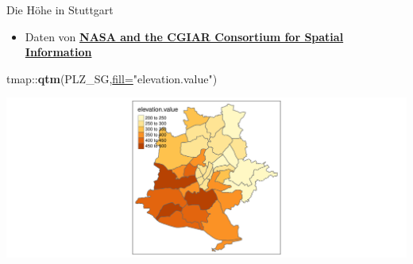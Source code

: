 \documentclass[ignorenonframetext,]{beamer}
\newenvironment{Shaded}{\begin{snugshade}}{\end{snugshade}}
\newcommand{\DataTypeTok}[1]{\textcolor[rgb]{0.74,0.68,0.62}{\underline{#1}}}
\newcommand{\KeywordTok}[1]{\textcolor[rgb]{0.26,0.66,0.93}{\textbf{#1}}}
\newcommand{\NormalTok}[1]{\textcolor[rgb]{0.74,0.68,0.62}{#1}}
\newcommand{\OperatorTok}[1]{\textcolor[rgb]{0.74,0.68,0.62}{#1}}
\newcommand{\StringTok}[1]{\textcolor[rgb]{0.02,0.61,0.04}{#1}}
\providecommand{\tightlist}{%
  \setlength{\itemsep}{0pt}\setlength{\parskip}{0pt}}
\begin{document}
\begin{frame}[fragile]{Die Höhe in Stuttgart}
\protect\hypertarget{die-hohe-in-stuttgart}{}

\begin{itemize}
\tightlist
\item
  Daten von \href{http://srtm.csi.cgiar.org/}{\textbf{NASA and the CGIAR
  Consortium for Spatial Information }}
\end{itemize}

\begin{Shaded}
\begin{Highlighting}[]
\NormalTok{tmap}\OperatorTok{::}\KeywordTok{qtm}\NormalTok{(PLZ_SG,}\DataTypeTok{fill=}\StringTok{"elevation.value"}\NormalTok{)}
\end{Highlighting}
\end{Shaded}

\includegraphics{B4_Overpass_files/figure-beamer/unnamed-chunk-28-1.pdf}

\end{frame}
\end{document}
